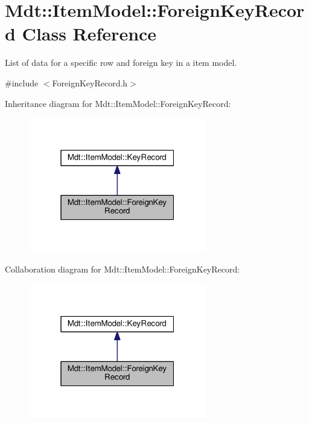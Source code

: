 \hypertarget{class_mdt_1_1_item_model_1_1_foreign_key_record}{}\section{Mdt\+:\+:Item\+Model\+:\+:Foreign\+Key\+Record Class Reference}
\label{class_mdt_1_1_item_model_1_1_foreign_key_record}


List of data for a specific row and foreign key in a item model.  




{\ttfamily \#include $<$Foreign\+Key\+Record.\+h$>$}



Inheritance diagram for Mdt\+:\+:Item\+Model\+:\+:Foreign\+Key\+Record\+:
\nopagebreak
\begin{figure}[H]
\begin{center}
\leavevmode
\includegraphics[width=220pt]{class_mdt_1_1_item_model_1_1_foreign_key_record__inherit__graph}
\end{center}
\end{figure}


Collaboration diagram for Mdt\+:\+:Item\+Model\+:\+:Foreign\+Key\+Record\+:
\nopagebreak
\begin{figure}[H]
\begin{center}
\leavevmode
\includegraphics[width=220pt]{class_mdt_1_1_item_model_1_1_foreign_key_record__coll__graph}
\end{center}
\end{figure}
